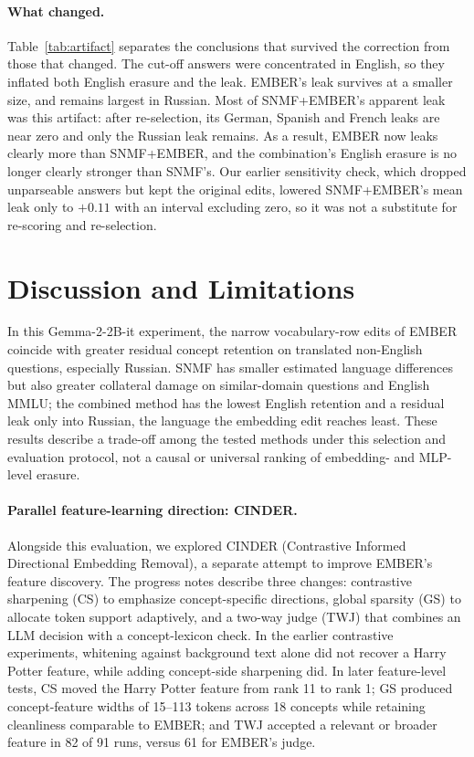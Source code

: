 \documentclass[11pt]{article}
\begin{document}
\paragraph{What changed.}
Table~\ref{tab:artifact} separates the conclusions that survived the correction from those that changed.
The cut-off answers were concentrated in English, so they inflated both English erasure and the leak.
EMBER's leak survives at a smaller size, and remains largest in Russian.
Most of SNMF+EMBER's apparent leak was this artifact: after re-selection, its German, Spanish and French leaks are near zero and only the Russian leak remains.
As a result, EMBER now leaks clearly more than SNMF+EMBER, and the combination's English erasure is no longer clearly stronger than SNMF's.
Our earlier sensitivity check, which dropped unparseable answers but kept the original edits, lowered SNMF+EMBER's mean leak only to $+0.11$ with an interval excluding zero, so it was not a substitute for re-scoring and re-selection.

\section{Discussion and Limitations}

In this Gemma-2-2B-it experiment, the narrow vocabulary-row edits of EMBER coincide with greater residual concept retention on translated non-English questions, especially Russian. SNMF has smaller estimated language differences but also greater collateral damage on similar-domain questions and English MMLU; the combined method has the lowest English retention and a residual leak only into Russian, the language the embedding edit reaches least. These results describe a trade-off among the tested methods under this selection and evaluation protocol, not a causal or universal ranking of embedding- and MLP-level erasure.

\paragraph{Parallel feature-learning direction: CINDER.}
Alongside this evaluation, we explored CINDER (Contrastive Informed Directional Embedding Removal), a separate attempt to improve EMBER's feature discovery. The progress notes describe three changes: contrastive sharpening (CS) to emphasize concept-specific directions, global sparsity (GS) to allocate token support adaptively, and a two-way judge (TWJ) that combines an LLM decision with a concept-lexicon check. In the earlier contrastive experiments, whitening against background text alone did not recover a Harry Potter feature, while adding concept-side sharpening did. In later feature-level tests, CS moved the Harry Potter feature from rank 11 to rank 1; GS produced concept-feature widths of 15--113 tokens across 18 concepts while retaining cleanliness comparable to EMBER; and TWJ accepted a relevant or broader feature in 82 of 91 runs, versus 61 for EMBER's judge.
\end{document}
